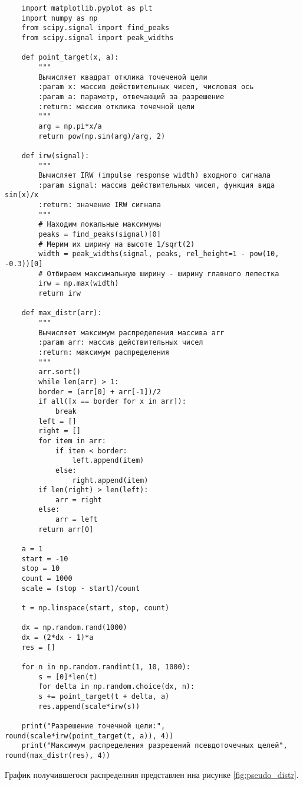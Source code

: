 \begin{verbatim}
	import matplotlib.pyplot as plt
	import numpy as np
	from scipy.signal import find_peaks
	from scipy.signal import peak_widths

	def point_target(x, a):
	    """
	    Вычисляет квадрат отклика точеченой цели
	    :param x: массив действительных чисел, числовая ось
	    :param a: параметр, отвечающий за разрешение
	    :return: массив отклика точечной цели
	    """
	    arg = np.pi*x/a
	    return pow(np.sin(arg)/arg, 2)

	def irw(signal):
	    """
	    Вычисляет IRW (impulse response width) входного сигнала
	    :param signal: массив действительных чисел, функция вида sin(x)/x
	    :return: значение IRW сигнала
	    """
	    # Находим локальные максимумы
	    peaks = find_peaks(signal)[0]
	    # Мерим их ширину на высоте 1/sqrt(2)
	    width = peak_widths(signal, peaks, rel_height=1 - pow(10, -0.3))[0]
	    # Отбираем максимальную ширину - ширину главного лепестка
	    irw = np.max(width)
	    return irw

	def max_distr(arr):
	    """
	    Вычисляет максимум распределения массива arr
	    :param arr: массив действительных чисел
	    :return: максимум распределения
	    """
	    arr.sort()    
	    while len(arr) > 1:    
		border = (arr[0] + arr[-1])/2       
		if all([x == border for x in arr]):
		    break            
		left = []
		right = []        
		for item in arr:
		    if item < border:
		        left.append(item)
		    else:
		        right.append(item)            
		if len(right) > len(left):
		    arr = right
		else:
		    arr = left		    
	    return arr[0]
		
	a = 1 
	start = -10
	stop = 10
	count = 1000
	scale = (stop - start)/count

	t = np.linspace(start, stop, count)

	dx = np.random.rand(1000)
	dx = (2*dx - 1)*a
	res = []

	for n in np.random.randint(1, 10, 1000):
	    s = [0]*len(t)
	    for delta in np.random.choice(dx, n):
		s += point_target(t + delta, a)        
	    res.append(scale*irw(s))

	print("Разрешение точечной цели:",  round(scale*irw(point_target(t, a)), 4))
	print("Максимум распределения разрешений псевдоточечных целей", round(max_distr(res), 4))
\end{verbatim}

	График получившегося распределния представлен нна рисунке \ref{fig:pseudo_distr}.

